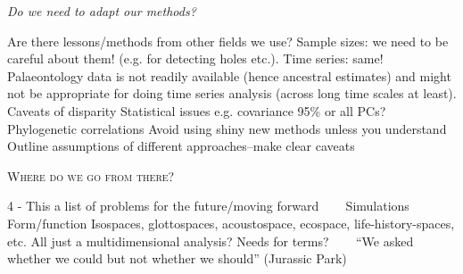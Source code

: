 \documentclass[12pt,letterpaper]{article}
\renewcommand{\section}[1]{%
\bigskip
\begin{center}
\begin{Large}
\normalfont\scshape #1
\medskip
\end{Large}
\end{center}}
\renewcommand{\subsection}[1]{%
\bigskip
\begin{center}
\begin{large}
\normalfont\itshape #1
\end{large}
\end{center}}
\begin{document}
\subsection{Do we need to adapt our methods?}
Are there lessons/methods from other fields we use?
Sample sizes: we need to be careful about them! (e.g. for detecting holes etc.).
Time series: same! Palaeontology data is not readily available (hence ancestral estimates) and might not be appropriate for doing time series analysis (across long time scales at least).
Caveats of disparity
Statistical issues e.g. covariance
95\% or all PCs?
Phylogenetic correlations
Avoid using shiny new methods unless you understand
Outline assumptions of different approaches--make clear caveats



\section{Where do we go from there?}
4 - This a list of problems for the future/moving forward
    Simulations 
    Form/function
Isospaces, glottospaces, acoustospace, ecospace, life-history-spaces, etc. All just a multidimensional analysis? Needs for terms?
    
``We asked whether we could but not whether we should'' (Jurassic Park)








\end{document}
